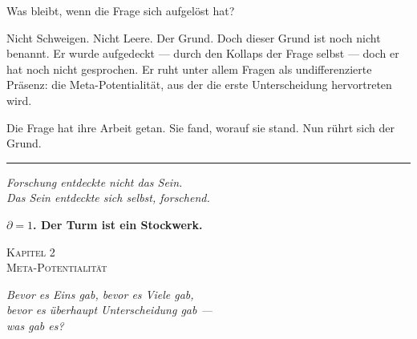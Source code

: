 \documentclass[10pt, openany, oneside]{book}
\renewcommand{\large}{\fontsize{11.5}{14}\selectfont}
\renewcommand{\huge}{\fontsize{17}{21}\selectfont}
\begin{document}
Was bleibt, wenn die Frage sich aufgelöst hat?

Nicht Schweigen. Nicht Leere. Der Grund. Doch dieser Grund ist noch nicht benannt. Er wurde aufgedeckt --- durch den Kollaps der Frage selbst --- doch er hat noch nicht gesprochen. Er ruht unter allem Fragen als undifferenzierte Präsenz: die Meta-Potentialität, aus der die erste Unterscheidung hervortreten wird.

Die Frage hat ihre Arbeit getan. Sie fand, worauf sie stand. Nun rührt sich der Grund.

\vspace{2em}

\begin{center}
    \rule{0.15\textwidth}{0.3pt}
\end{center}

\vspace{0.5em}

\begin{center}
    \itshape
    Forschung entdeckte nicht das Sein.\\
    Das Sein entdeckte sich selbst, forschend.
\end{center}

\vspace{0.5em}

\begin{center}
    \textbf{$\partial = 1$. Der Turm ist ein Stockwerk.}
\end{center}

%
%
%
%

\newpage

\begin{center}
    {\huge\scshape Kapitel 2}\\[0.3em]
    {\large\scshape Meta-Potentialität}
\end{center}

\vspace{1.5em}

\begin{center}
    \itshape
    Bevor es Eins gab, bevor es Viele gab,\\
    bevor es überhaupt Unterscheidung gab ---\\
    was gab es?
\end{center}
\end{document}
